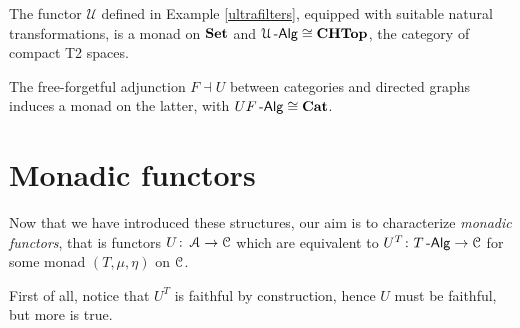 \documentclass[a4paper,11pt,oneside,openany]{scrbook}
\begin{document}
\begin{exmp}
	The functor $\mathcal{U}$ defined in Example \ref{ultrafilters}, equipped with suitable natural transformations, is a monad on ${\normalfont\textbf{Set}}$ and $\mathcal{U}\operatorname{-\mathsf{Alg}}\cong {\normalfont\textbf{CHTop}}$, the category of compact T2 spaces.
\end{exmp}

\begin{exmp}
	The free-forgetful adjunction $F\dashv U$ between categories and directed graphs induces a monad on the latter, with $UF\operatorname{-\mathsf{Alg}}\cong{\normalfont\textbf{Cat}}$.
\end{exmp}

\section{Monadic functors}

Now that we have introduced these structures, our aim is to characterize \emph{monadic functors}, that is functors $U\colon\operatorname{\mathcal{A}}\rightarrow\operatorname{\mathcal{C}}$ which are equivalent to $U^T\colon T\operatorname{-\mathsf{Alg}}\rightarrow\operatorname{\mathcal{C}}$ for some monad $(T,\mu,\eta)$ on $\operatorname{\mathcal{C}}$.

First of all, notice that $U^T$ is faithful by construction, hence $U$ must be faithful, but more is true.
\end{document}
